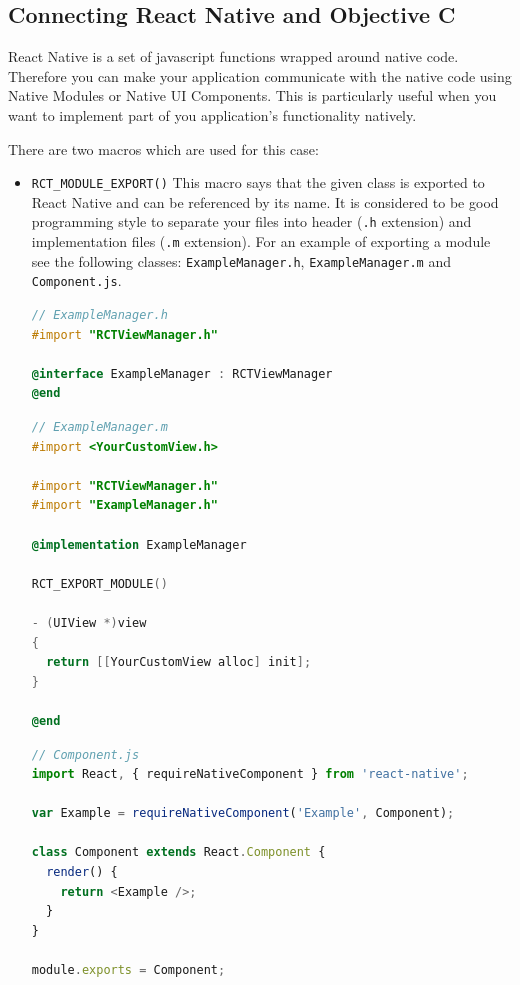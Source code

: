 \documentclass[thesis=M,english]{FITthesis}[2012/10/20]
\begin{document}
\subsection{Connecting React Native and Objective C}
React Native is a set of javascript functions wrapped around native code. Therefore you can make your application communicate with the native code using Native Modules or Native UI Components. This is particularly useful when you want to implement part of you application's functionality natively.  

There are two macros which are used for this case:

\begin{itemize}
\item  \verb|RCT_MODULE_EXPORT()| 
This macro says that the given class is exported to React Native and can be referenced by its name. It is considered to be good programming style to separate your files into header (\verb|.h| extension) and implementation files (\verb|.m| extension). For an example of exporting a module see the following classes: \verb|ExampleManager.h|, \verb|ExampleManager.m| and \verb|Component.js|.


\begin{lstlisting}[language=C]
// ExampleManager.h
#import "RCTViewManager.h"

@interface ExampleManager : RCTViewManager
@end

\end{lstlisting}

\begin{lstlisting}[language=C]
// ExampleManager.m
#import <YourCustomView.h>

#import "RCTViewManager.h"
#import "ExampleManager.h"

@implementation ExampleManager

RCT_EXPORT_MODULE()

- (UIView *)view
{
  return [[YourCustomView alloc] init];
}

@end
\end{lstlisting}

\begin{lstlisting}[language=javascript]
// Component.js
import React, { requireNativeComponent } from 'react-native';

var Example = requireNativeComponent('Example', Component);

class Component extends React.Component {
  render() {
    return <Example />;
  }
}

module.exports = Component;
\end{lstlisting}
  

\end{itemize}
\end{document}

